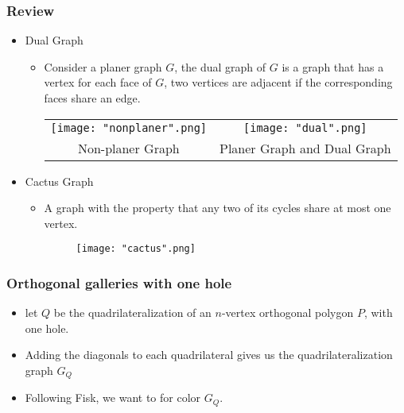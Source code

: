 \documentclass{beamer}
\begin{document}
\begin{frame}
\frametitle{Review}
\begin{center}
\begin{itemize}
	\item Dual Graph
		\begin{itemize}
			\item Consider a planer graph $G$, the dual graph of $G$ is a graph that has a vertex for each face of $G$, two vertices are adjacent if the corresponding faces share an edge. 
\begin{center}
\begin{tabular}{cc}
  \texttt{[image: "nonplaner".png]}
  &
  \texttt{[image: "dual".png]}
   \\                                                     
   Non-planer Graph& Planer Graph and Dual Graph
 \end{tabular}
 \end{center}
\end{itemize}
	\item Cactus Graph
		\begin{itemize}
			\item A graph with the property that any two of its cycles share at most one vertex. 
		\begin{center}
		\begin{figure}[H]
		\centering
		\texttt{[image: "cactus".png]}
		\end{figure}
		\end{center}
		\end{itemize}
\end{itemize}
\end{center}
\end{frame}






\begin{frame}
\frametitle{Orthogonal galleries with one hole}
\begin{itemize}
	\item let $Q$ be the quadrilateralization of an $n$-vertex orthogonal polygon $P$, with one hole. 
	\vfill
	\item Adding the diagonals to each quadrilateral gives us the quadrilateralization graph $G_Q$
	\vfill
	\item Following Fisk, we want to for color $G_Q$.
\end{itemize}
\end{frame}
\end{document}
